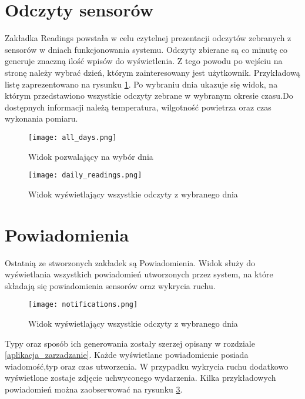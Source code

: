 \section{Odczyty sensorów}
Zakładka Readings powstała w celu czytelnej prezentacji odczytów zebranych z sensorów w dniach funkcjonowania systemu. Odczyty zbierane są co minutę co generuje znaczną ilość wpisów do wyświetlenia. Z tego powodu po wejściu na stronę należy wybrać dzień, którym zainteresowany jest użytkownik. Przykładową listę zaprezentowano na rysunku \ref{fig:all_days}. Po wybraniu dnia ukazuje się widok, na którym przedstawiono wszystkie odczyty zebrane w wybranym okresie czasu.Do dostępnych informacji należą temperatura, wilgotność powietrza oraz czas wykonania pomiaru.
\begin{figure}[H]
	\centering
	\texttt{[image: all\_days.png]}
	\caption{Widok pozwalający na wybór dnia}
	\label{fig:all_days}
\end{figure}
\begin{figure}[H]
	\centering
	\texttt{[image: daily\_readings.png]}
	\caption{Widok wyświetlający wszystkie odczyty z wybranego dnia}
	\label{fig:daily_readings}
\end{figure}

\section{Powiadomienia} \label{notifications}
Ostatnią ze stworzonych zakładek są Powiadomienia. Widok służy do wyświetlania wszystkich powiadomień utworzonych przez system, na które składają się powiadomienia sensorów oraz wykrycia ruchu.
\begin{figure}[H]
	\centering
	\texttt{[image: notifications.png]}
	\caption{Widok wyświetlający wszystkie odczyty z wybranego dnia}
	\label{fig:notifications}
\end{figure}
 Typy oraz sposób ich generowania zostały szerzej opisany w rozdziale \ref{aplikacja_zarzadzanie}. Każde wyświetlane powiadomienie posiada wiadomość,typ oraz czas utworzenia. W przypadku wykrycia ruchu dodatkowo wyświetlone zostaje zdjęcie uchwyconego wydarzenia. Kilka przykładowych powiadomień można zaobserwować na rysunku \ref{fig:notifications}.
 
